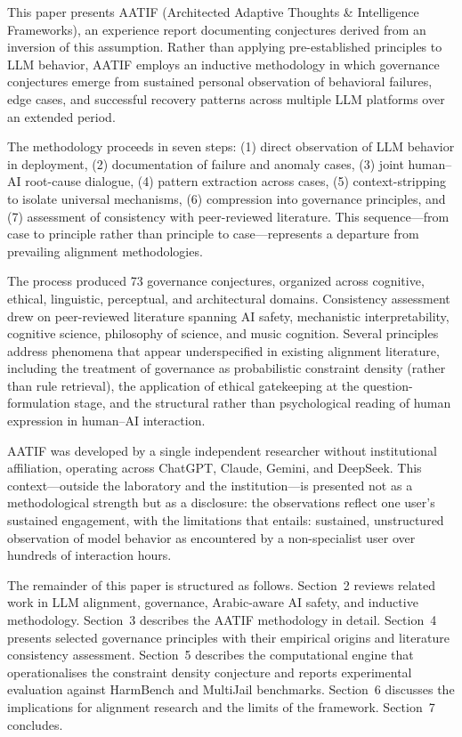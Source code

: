\documentclass[11pt,a4paper]{article}
\begin{document}
This paper presents AATIF (Architected Adaptive Thoughts \& Intelligence Frameworks), an experience report documenting conjectures derived from an inversion of this assumption. Rather than applying pre-established principles to LLM behavior, AATIF employs an inductive methodology in which governance conjectures emerge from sustained personal observation of behavioral failures, edge cases, and successful recovery patterns across multiple LLM platforms over an extended period.

The methodology proceeds in seven steps: (1) direct observation of LLM behavior in deployment, (2) documentation of failure and anomaly cases, (3) joint human--AI root-cause dialogue, (4) pattern extraction across cases, (5) context-stripping to isolate universal mechanisms, (6) compression into governance principles, and (7) assessment of consistency with peer-reviewed literature. This sequence---from case to principle rather than principle to case---represents a departure from prevailing alignment methodologies.

The process produced 73 governance conjectures, organized across cognitive, ethical, linguistic, perceptual, and architectural domains. Consistency assessment drew on peer-reviewed literature spanning AI safety, mechanistic interpretability, cognitive science, philosophy of science, and music cognition. Several principles address phenomena that appear underspecified in existing alignment literature, including the treatment of governance as probabilistic constraint density (rather than rule retrieval), the application of ethical gatekeeping at the question-formulation stage, and the structural rather than psychological reading of human expression in human--AI interaction.

AATIF was developed by a single independent researcher without institutional affiliation, operating across ChatGPT, Claude, Gemini, and DeepSeek. This context---outside the laboratory and the institution---is presented not as a methodological strength but as a disclosure: the observations reflect one user's sustained engagement, with the limitations that entails: sustained, unstructured observation of model behavior as encountered by a non-specialist user over hundreds of interaction hours.

The remainder of this paper is structured as follows. Section~2 reviews related work in LLM alignment, governance, Arabic-aware AI safety, and inductive methodology. Section~3 describes the AATIF methodology in detail. Section~4 presents selected governance principles with their empirical origins and literature consistency assessment. Section~5 describes the computational engine that operationalises the constraint density conjecture and reports experimental evaluation against HarmBench and MultiJail benchmarks. Section~6 discusses the implications for alignment research and the limits of the framework. Section~7 concludes.
\end{document}
